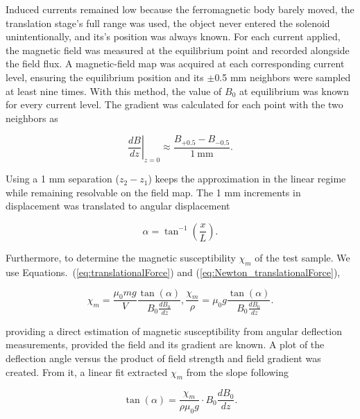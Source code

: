 Induced currents remained low because the ferromagnetic body barely moved, the translation stage’s full range was used, the object never entered the solenoid unintentionally, and its’s position was always known. For each current applied, the magnetic field was measured at the equilibrium point and recorded alongside the field flux. A magnetic-field map was acquired at each corresponding current level, ensuring the equilibrium position and its $\pm$0.5 mm neighbors were sampled at least nine times. With this method, the value of $B_0$ at equilibrium was known for every current level. The gradient was calculated for each point with the two neighbors as 

\begin{equation}
	\label{eq:finiteDiff1}
		\left. \frac{dB}{dz} \right|_{z=0} \approx \frac{B_{+0.5} - B_{-0.5}}{1\ \text{mm}}.
\end{equation}

Using a 1 mm separation ($z_2 - z_1$) keeps the approximation in the linear regime while remaining resolvable on the field map. The 1 mm increments in displacement was translated to angular displacement

\begin{equation}
	\alpha = \tan^{-1}\left(\frac{x}{L}\right).
\end{equation}

Furthermore, to determine the magnetic susceptibility $\chi_m$ of the test sample. We use Equations.~(\ref{eq:translationalForce}) and (\ref{eq:Newton_translationalForce}), 

\begin{subequations}
	\begin{equation}
		\chi_m = \frac{\mu_0 m g}{V}\frac{\tan (\alpha)}{ B_0 \frac{dB_0}{dz}},
		\label{eq:chi}
	\end{equation}
	\begin{equation}
		\frac{\chi_m}{\rho} = \mu_0 g\frac{\tan (\alpha)}{ B_0 \frac{dB_0}{dz}}.
		\label{eq:chi_rho}
	\end{equation}
	\label{eq:chis}
\end{subequations}

\noindent providing a direct estimation of magnetic susceptibility from angular deflection measurements, provided the field and its gradient are known. A plot of the deflection angle versus the product of field strength and field gradient was created. From it, a linear fit extracted $\chi_m$ from the slope following

\begin{equation}
	\tan (\alpha) =   \frac{\chi_m }{\rho \mu_0 g}  \cdot B_0 \frac{dB_0}{dz}.
	\label{eq:forFit}
\end{equation}

